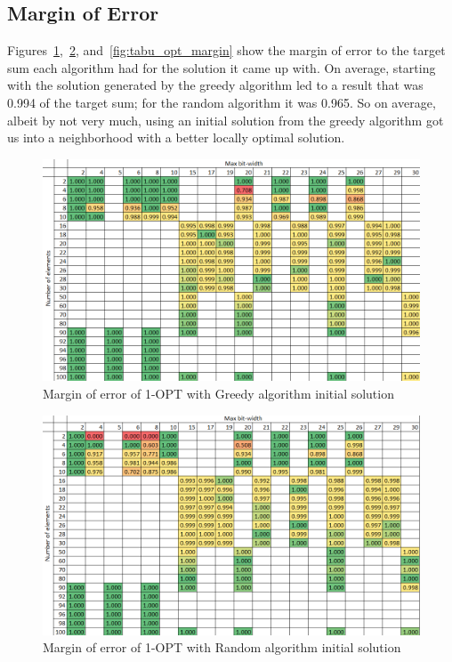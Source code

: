 \documentclass{report}
\begin{document}
\subsection{Margin of Error}
Figures~\ref{fig:greedy_opt_margin},~\ref{fig:random_opt_margin}, and~\ref{fig:tabu_opt_margin} show the margin
of error to the target sum each algorithm had for the solution it came up with. On average, starting with the solution
generated by the greedy algorithm led to a result that was 0.994 of the target sum; for the random algorithm it was 0.965.
So on average, albeit by not very much, using an initial solution from the greedy algorithm got us into a neighborhood with
a better locally optimal solution. 

\begin{figure}[h]
  \centering
  \includegraphics[width=12cm]{p5_greedy_margin.png}
  \caption{Margin of error of 1-OPT with Greedy algorithm initial solution}
  \label{fig:greedy_opt_margin}
\end{figure}

\begin{figure}[h]
  \centering
  \includegraphics[width=12cm]{p5_random_margin.png}
  \caption{Margin of error of 1-OPT with Random algorithm initial solution}
  \label{fig:random_opt_margin}
\end{figure}
\end{document}
